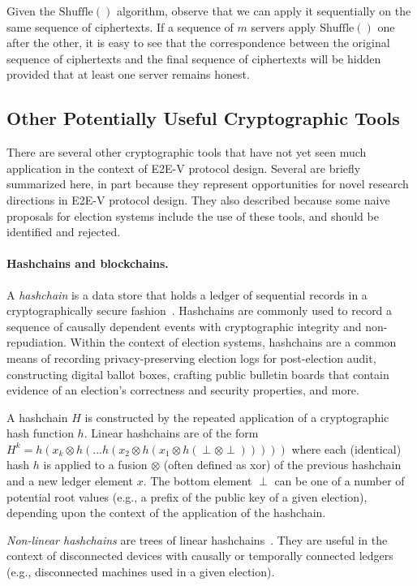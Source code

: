 Given the $\mathrm{Shuffle}()$ algorithm, observe that we can apply it
sequentially on the same sequence of ciphertexts. If a sequence of $m$
servers apply $\mathrm{Shuffle}()$ one after the other, it is easy to
see that the correspondence between the original sequence of
ciphertexts and the final sequence of ciphertexts will be hidden
provided that at least one server remains honest.

\subsection{Other Potentially Useful Cryptographic Tools}

There are several other cryptographic tools that have not yet seen
much application in the context of E2E-V protocol design. Several are
briefly summarized here, in part because they represent opportunities
for novel research directions in E2E-V protocol design. They also
described because some naive proposals for election systems include
the use of these tools, and should be identified and rejected.

\paragraph{Hashchains and blockchains.} A \emph{hashchain} is a data
store that holds a ledger of sequential records in a cryptographically
secure fashion~\cite{Haber90}. Hashchains are commonly used to record
a sequence of causally dependent events with cryptographic integrity
and non-repudiation. Within the context of election systems,
hashchains are a common means of recording privacy-preserving election
logs for post-election audit, constructing digital ballot boxes,
crafting public bulletin boards that contain evidence of an election's
correctness and security properties, and more.

A hashchain $H$ is constructed by the repeated application of a
cryptographic hash function $h$. Linear hashchains are of the form
$H^{k}=h(x_{k} \otimes h(...h(x_{2} \otimes h(x_{1} \otimes h(\perp
\otimes \perp)))))$
where each (identical) hash $h$ is applied to a fusion $\otimes$
(often defined as xor) of the previous hashchain and a new ledger
element $x$. The bottom element $\perp$ can be one of a number of
potential root values (e.g., a prefix of the public key of a given
election), depending upon the context of the application of the
hashchain. 

\emph{Non-linear hashchains} are trees of linear
hashchains~\cite{Benaloh91,Bayer93}. They are useful in the context of
disconnected devices with causally or temporally connected ledgers
(e.g., disconnected machines used in a given election).

